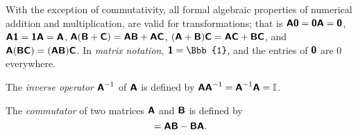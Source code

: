 With the exception of commutativity, all formal algebraic properties
of numerical addition and multiplication,
are valid for transformations; that is
$
\textsf{\textbf{A}}\textsf{\textbf{0}}=
\textsf{\textbf{0}}\textsf{\textbf{A}} =\textsf{\textbf{0}}
$,
$
\textsf{\textbf{A}}\textsf{\textbf{1}}=
\textsf{\textbf{1}}\textsf{\textbf{A}} =\textsf{\textbf{A}}
$,
$
\textsf{\textbf{A}} (\textsf{\textbf{B}}+\textsf{\textbf{C}})=
\textsf{\textbf{A}} \textsf{\textbf{B}}
+
\textsf{\textbf{A}} \textsf{\textbf{C}}
$,
$
(\textsf{\textbf{A}}+ \textsf{\textbf{B}})\textsf{\textbf{C}}=
\textsf{\textbf{A}} \textsf{\textbf{C}}
+
\textsf{\textbf{B}} \textsf{\textbf{C}}
$,  and
$
\textsf{\textbf{A}} (\textsf{\textbf{B}}\textsf{\textbf{C}})=
(\textsf{\textbf{A}} \textsf{\textbf{B}})
 \textsf{\textbf{C}}
$.
In {\em matrix notation},  $\textsf{\textbf{1}} ={\Bbb{1}}$, and the entries of $\textsf{\textbf{0}}$
are $0$ everywhere.

The {\em inverse operator}
$\textsf{\textbf{A}}^{-1}$
of $\textsf{\textbf{A}}$
is defined by
$\textsf{\textbf{A}}\textsf{\textbf{A}}^{-1}=\textsf{\textbf{A}}^{-1}\textsf{\textbf{A}}=
{\Bbb I}$.


The {\em commutator}
of two matrices $\textsf{\textbf{A}}$  and $\textsf{\textbf{B}}$ is defined by
\begin{equation}
[\textsf{\textbf{A}}, \textsf{\textbf{B}} ]
=
\textsf{\textbf{A}} \textsf{\textbf{B}}
-
 \textsf{\textbf{B}}      \textsf{\textbf{A}}.
\end{equation}



